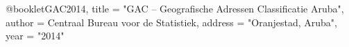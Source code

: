 @booklet{GAC2014,
  title        = "GAC -- Geografische Adressen Classificatie Aruba",
  author       = {{Centraal Bureau voor de Statistiek}},
  address      = "Oranjestad, Aruba",
  year         = "2014"
}
